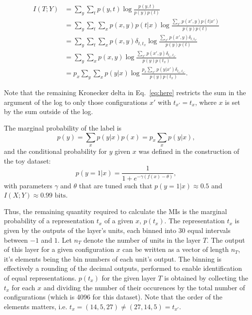 \documentclass[12pt]{report}
\begin{document}
\begin{align}
I(T;Y) &= \sum \limits_{y} \sum \limits_{t} p(y,t) \log\frac{p(y,t)}{p(y)p(t)}\\
&= \sum \limits_{y} \sum \limits_{t} \sum \limits_{x} p(x,y) p(t|x) \log\frac{ \sum \limits_{x'} p(x',y) p(t|x') }{p(y)p(t)}\\
&= \sum \limits_{y} \sum \limits_{t} \sum \limits_{x} p(x,y) \delta_{t,t_x} \log\frac{ \sum \limits_{x'} p(x',y) \delta_{t,t_{x'}} }{p(y)p(t)}\\
&= \sum \limits_{y} \sum \limits_{x} p(x,y) \log\frac{ \sum \limits_{x'} p(x',y) \delta_{t_x,t_{x'}} }{p(y)p(t_x)}\\
&= p_x \sum \limits_{y} \sum \limits_{x} p(y|x) \log\frac{ p_x \sum \limits_{x'} p(y|x') \delta_{t_x,t_{x'}} }{p(y)p(t_x)}. \label{eq:here}
\end{align}

Note that the remaining Kronecker delta in Eq.~\eqref{eq:here} restricts the sum in the argument of the log to only those configurations $x'$ with $t_{x'}=t_x$, where $x$ is set by the sum outside of the log.


The marginal probability of the label is
\begin{equation}
p(y) = \sum\limits_x p(y|x)p(x) = p_x \sum\limits_x p(y|x),
\end{equation}
and the conditional probability for $y$ given $x$ was defined in the construction of the toy dataset:
\begin{equation}
p(y=1|x) = \frac{1}{1+e^{-\gamma (f(x)-\theta)}},
\end{equation}
with parameters $\gamma$ and $\theta$ that are tuned such that $p(y=1|x) \approx 0.5$ and $I(X;Y) \approx 0.99 \text{ bits}$.

Thus, the remaining quantity required to calculate the MIs is the marginal probability of a representation $t_x$ of a given $x$, $p(t_x)$. The representation $t_x$ is given by the outputs of the layer's units, each binned into 30 equal intervals between $-1$ and $1$. Let $n_T$ denote the number of units in the layer $T$. The output of this layer for a given configuration $x$ can be written as a vector of length $n_T$, it's elements being the bin numbers of each unit's output. The binning is effectively a rounding of the decimal outputs, performed to enable identification of equal representations. $p(t_x)$ for the given layer $T$ is obtained by collecting the $t_x$ for each $x$ and dividing the number of their occurences by the total number of configurations (which is 4096 for this dataset). Note that the order of the elements matters, i.e. $t_x = (14, 5, 27) \neq (27, 14, 5) = t_{x'}$.
\end{document}
